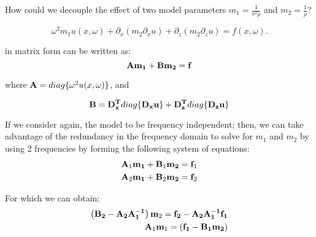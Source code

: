 \documentclass[10pt]{article}
\begin{document}
How could we decouple the effect of two model parameters $m_1 = \frac{1}{v^2\rho}$ and $m_2 = \frac{1}{\rho}$?


\begin{equation}
  \omega^2 m_1 u(x,\omega) +\partial_x(m_2 \partial_x u)+\partial_z(m_2 \partial_z u)  = f(x,\omega).
  \label{eq:vden2}
\end{equation}

in matrix form can be written as:
\begin{equation}
  {\bf A} {\bf m_1} + {\bf B} {\bf m_2} = {\bf f}
\end{equation}

where ${\bf A} = diag\{\omega^2 u(x,\omega)\}$, and 

\begin{equation}
 {\bf B} = {\bf D_x^T}{ diag\{\bf D_x u\}} + {\bf D_z^T}{ diag\{\bf D_z u\}} 
\end{equation}

If we consider again, the model to be frequency independent; then, we can take advantage of the 
redundancy in the frequency domain to solve for $m_1$ and $m_2$ by using 2 frequencies by forming the following
system of equations:
\begin{align}
  {\bf A}_1 {\bf m_1} + {\bf B}_1 {\bf m_2} = {\bf f}_1 \\
  {\bf A}_2 {\bf m_1} + {\bf B}_2 {\bf m_2} = {\bf f}_2
\end{align}

For which we can obtain:
\begin{align}
  \left( {\bf B_2}-{\bf A_2}{\bf A_1^{-1}} \right) {\bf m}_2 = {\bf f_2} -{\bf A_2}{\bf A_1^{-1} f_1} \\
 {\bf A}_1 {\bf m}_1 = ({\bf f_1}-{\bf B_1 m_2}) 
\end{align}
\end{document}
